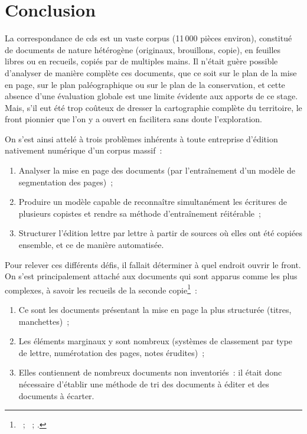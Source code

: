 \documentclass[a4paper,12pt,twoside]{book}
\begin{document}
	\pagestyle{empty}
	\cleardoublepage
	\pagestyle{plain}			
		
	\chapter*{Conclusion}
		
		La correspondance de \gls{cds} est un vaste corpus (11\,000 pièces environ), constitué de documents de nature hétérogène (originaux, brouillons, copie), en feuilles libres ou en recueils, copiés par de multiples mains. Il n'était guère possible d'analyser de manière complète ces documents, que ce soit sur le plan de la mise en page, sur le plan paléographique ou sur le plan de la conservation, et cette absence d'une évaluation globale est une limite évidente aux apports de ce stage. Mais, s'il eut été trop coûteux de dresser la cartographie complète du territoire, le front pionnier que l'on y a ouvert en facilitera sans doute l'exploration.
		
		On s'est ainsi attelé à trois problèmes inhérents à toute entreprise d'édition nativement numérique d'un corpus massif~: 
		
		\begin{enumerate}
			\item Analyser la mise en page des documents (par l'entraînement d'un modèle de segmentation des pages)~;
			\item Produire un modèle capable de reconnaître simultanément les écritures de plusieurs copistes et rendre sa méthode d'entraînement réitérable~;
			\item Structurer l'édition lettre par lettre à partir de sources où elles ont été copiées ensemble, et ce de manière automatisée.
		\end{enumerate}
		
		Pour relever ces différents défis, il fallait déterminer à quel endroit ouvrir le front. On s'est principalement attaché aux documents qui sont apparus comme les plus complexes, à savoir les recueils de la seconde copie\footnote{\cite{CdS02001330}~; \cite{CdS02001369}~; \cite{CdS02001334}.}~:
		
		\begin{enumerate}
			\item Ce sont les documents présentant la mise en page la plus structurée (titres, manchettes)~;
			\item Les éléments marginaux y sont nombreux (systèmes de classement par type de lettre, numérotation des pages, notes érudites)~;
			\item Elles contiennent de nombreux documents non inventoriés~: il était donc nécessaire d'établir une méthode de tri des documents à éditer et des documents à écarter.
		\end{enumerate}
		
\end{document}
